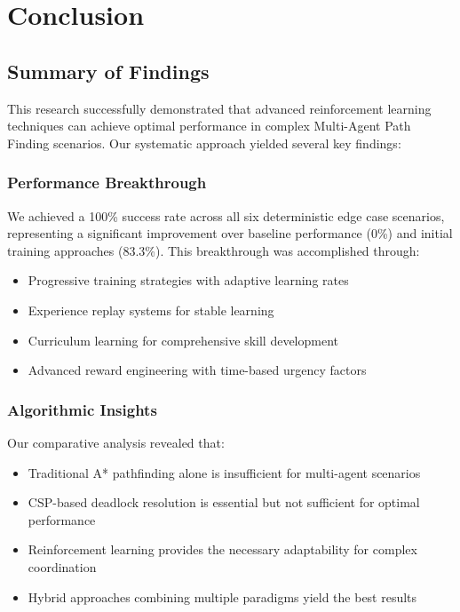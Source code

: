 \documentclass[12pt, a4paper]{report}
\begin{document}
\chapter{Conclusion}

\section{Summary of Findings}

This research successfully demonstrated that advanced reinforcement learning techniques can achieve optimal performance in complex Multi-Agent Path Finding scenarios. Our systematic approach yielded several key findings:

\subsection{Performance Breakthrough}
We achieved a 100\% success rate across all six deterministic edge case scenarios, representing a significant improvement over baseline performance (0\%) and initial training approaches (83.3\%). This breakthrough was accomplished through:
\begin{itemize}
    \item Progressive training strategies with adaptive learning rates
    \item Experience replay systems for stable learning
    \item Curriculum learning for comprehensive skill development
    \item Advanced reward engineering with time-based urgency factors
\end{itemize}

\subsection{Algorithmic Insights}
Our comparative analysis revealed that:
\begin{itemize}
    \item Traditional A* pathfinding alone is insufficient for multi-agent scenarios
    \item CSP-based deadlock resolution is essential but not sufficient for optimal performance
    \item Reinforcement learning provides the necessary adaptability for complex coordination
    \item Hybrid approaches combining multiple paradigms yield the best results
\end{itemize}
\end{document}

